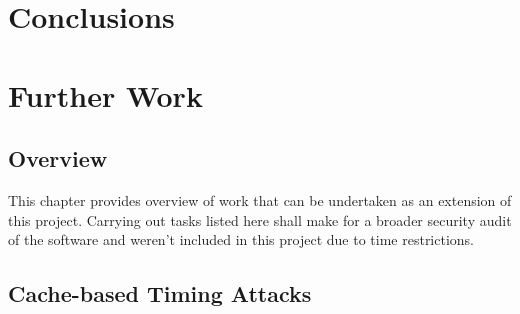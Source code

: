 \documentclass{report}
\begin{document}
\chapter{Conclusions}
\chapter{Further Work}
\section{Overview}
This chapter provides overview of work that can be undertaken as an extension of this project. Carrying out tasks listed here shall make for a broader security audit of the software and weren't included in this project due to time restrictions.
\section{Cache-based Timing Attacks}
\end{document}
